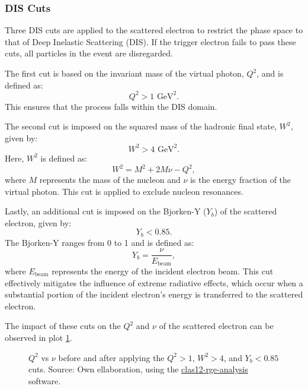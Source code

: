 \subsubsection{DIS Cuts}
\label{sssec::dis_cuts}
    Three DIS cuts are applied to the scattered electron to restrict the phase space to that of Deep Inelastic Scattering (DIS).
    If the trigger electron fails to pass these cuts, all particles in the event are disregarded.

    The first cut is based on the invariant mass of the virtual photon, $Q^2$, and is defined as:
    \begin{equation*}
        Q^2 > 1 \text{ GeV}^2.
    \end{equation*}
    This ensures that the process falls within the DIS domain.

    The second cut is imposed on the squared mass of the hadronic final state, $W^2$, given by:
    \begin{equation*}
        W^2 > 4 \text{ GeV}^2.
    \end{equation*}
    Here, $W^2$ is defined as:
    \begin{equation*}
        W^2 = M^2 + 2M\nu - Q^2,
    \end{equation*}
    where $M$ represents the mass of the nucleon and $\nu$ is the energy fraction of the virtual photon.
    This cut is applied to exclude nucleon resonances.

    Lastly, an additional cut is imposed on the Bjorken-Y ($Y_b$) of the scattered electron, given by:
    \begin{equation*}
        Y_b < 0.85.
    \end{equation*}
    The Bjorken-Y ranges from 0 to 1 and is defined as:
    \begin{equation*}
        Y_b = \frac{\nu}{E_\text{beam}},
    \end{equation*}
    where $E_\text{beam}$ represents the energy of the incident electron beam.
    This cut effectively mitigates the influence of extreme radiative effects, which occur when a substantial portion of the incident electron's energy is transferred to the scattered electron.

    The impact of these cuts on the $Q^2$ and $\nu$ of the scattered electron can be observed in plot \ref{fig::q2vsnu}.

    \begin{figure}[b!]
        \centering{}
        \caption[$Q^2$ vs $\nu$ comparison]{$Q^2$ vs $\nu$ before and after applying the $Q^2 > 1$, $W^2 > 4$, and $Y_b < 0.85$ cuts.
        Source: Own ellaboration, using the \hyperlink{github.com/bleaktwig/clas12-rge-analysis}{clas12-rge-analysis} software.}
        \label{fig::q2vsnu}
    \end{figure}
